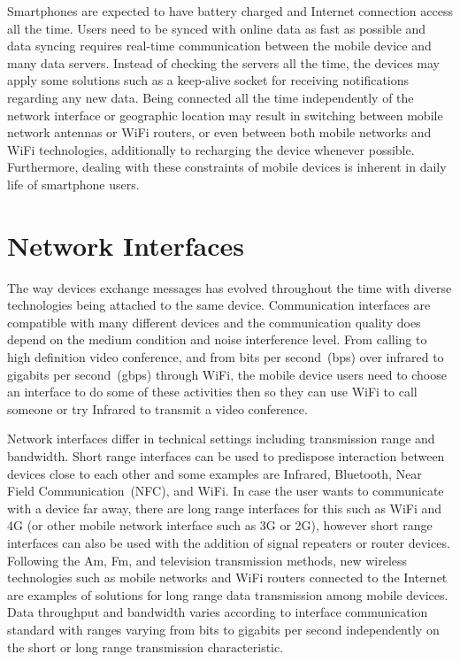 Smartphones are expected to have battery charged and Internet connection access all the time.
Users need to be synced with online data as fast as possible and data syncing requires real-time communication between the mobile device and many data servers.
Instead of checking the servers all the time, the devices may apply some solutions such as a keep-alive socket for receiving notifications regarding any new data.
Being connected all the time independently of the network interface or geographic location may result in switching between mobile network antennas or WiFi routers, or even between both mobile networks and WiFi technologies, additionally to recharging the device whenever possible.
Furthermore, dealing with these constraints of mobile devices is inherent in daily life of smartphone users. %



\section{Network Interfaces}
\label{sec:networkinterfaces}

The way devices exchange messages has evolved throughout the time with diverse technologies being attached to the same device.
Communication interfaces are compatible with many different devices and the communication quality does depend on the medium condition and noise interference level.
From calling to high definition video conference, and from bits per second~(bps) over infrared to gigabits per second~(gbps) through WiFi, the mobile device users need to choose an interface to do some of these activities then so they can use WiFi to call someone or try Infrared to transmit a video conference.

Network interfaces differ in technical settings including transmission range and bandwidth.
Short range interfaces can be used to predispose interaction between devices close to each other and some examples are Infrared, Bluetooth, Near Field Communication~(NFC), and WiFi.
In case the user wants to communicate with a device far away, there are long range interfaces for this such as WiFi and 4G (or other mobile network interface such as 3G or 2G), however short range interfaces can also be used with the addition of signal repeaters or router devices.
Following the Am, Fm, and television transmission methods, new wireless technologies such as mobile networks and WiFi routers connected to the Internet are examples of solutions for long range data transmission among mobile devices.
Data throughput and bandwidth varies according to interface communication standard with ranges varying from bits to gigabits per second independently on the short or long range transmission characteristic.

